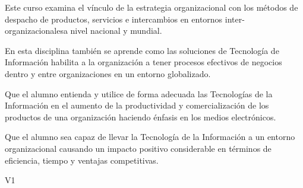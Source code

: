\begin{syllabus}


\begin{justification}
Este curso examina el vínculo de la estrategia organizacional con los métodos de despacho de productos, servicios e intercambios en entornos inter-organizacionalesa nivel nacional y mundial.

En esta disciplina también se aprende como las soluciones de Tecnología de Información habilita a la organización a tener procesos efectivos de negocios dentro y entre organizaciones en un entorno globalizado.
\end{justification}

\begin{goals}
\item Que el alumno entienda y utilice de forma adecuada las Tecnologías de la Información en el aumento de la productividad y comercialización de los productos de una organización haciendo énfasis en los medios electrónicos.
\item Que el alumno sea capaz de llevar la Tecnología de la Información a un entorno organizacional causando un impacto positivo considerable en términos de eficiencia, tiempo y ventajas competitivas.
\end{goals}

\begin{outcomes}{V1}
   \item{}
   \item {}
   \item {}
   \item {}
   \item {}
   \item {}
   \item {}
   \item {}
\end{outcomes}


\end{syllabus}

